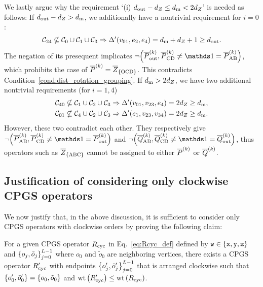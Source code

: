 \documentclass[
 prx,
 reprint,
 superscriptaddress,
 longbibliography,
 dvipsnames
]{revtex4-2}
\begin{document}
\begin{widetext}
We lastly argue why the requirement `(i) $d_{\mathrm{out}} - {d_Z} \leq d_{\mathrm{m}} < 2{d_Z}$' is needed as follows:
If $d_{\mathrm{out}} - {d_Z} > d_{\mathrm{m}}$, we additionally have a nontrivial requirement for $i=0$:
\begin{align*}
    \mathcal{C}_{24} \nsubseteq \mathcal{C}_{0} \cup \mathcal{C}_{1} \cup \mathcal{C}_{3} \Rightarrow \Delta'\qty(v_{01}, e_2, e_4) = d_{\mathrm{m}} + {d_Z} + 1 \geq d_{\mathrm{out}}.
\end{align*}
The negation of its presequent implicates $\neg\qty(\Pstage{k}_\mr{out},\Pstage{k}_\mr{CD} \neq \identity = \Pstage{k}_\mr{AB})$, which prohibits the case of $\overline{P}^{(k)} = \overline{Z}_\qty{\text{OCD}}$.
This contradicts Condition~\ref{cond:dist_rotation_grouping}.
If $d_{\mathrm{m}} > 2{d_Z}$, we have two additional nontrivial requirements (for $i=1,4$)
\begin{align*}
    \mathcal{C}_{40} \nsubseteq \mathcal{C}_{1} \cup \mathcal{C}_{2} \cup \mathcal{C}_{3} \Rightarrow \Delta'\qty(v_{01}, v_{23}, e_4) = 2{d_Z} \geq d_{\mathrm{m}},  \\ 
    \mathcal{C}_{01} \nsubseteq \mathcal{C}_{4} \cup \mathcal{C}_{2} \cup \mathcal{C}_{3} \Rightarrow \Delta'\qty(e_1, v_{23}, v_{34}) = 2{d_Z} \geq d_{\mathrm{m}}.
\end{align*}
However, these two contradict each other.
They respectively give $\neg \qty(\Pstage{k}_\mr{AB}, \Pstage{k}_\mr{CD} \neq \identity = \Pstage{k}_\mr{out})$ and $\neg \qty(\Qstage{k}_\mr{AB}, \Qstage{k}_\mr{CD} \neq \identity = \Qstage{k}_\mr{out})$, thus operators such as $\overline{Z}_\qty{\text{ABC}}$ cannot be assigned to either $\overline{P}^{(k)}$ or $\overline{Q}^{(k)}$.
\end{widetext}

\subsection{Justification of considering only clockwise CPGS operators \label{subapp:justification_clockwise_CPGS}}

We now justify that, in the above discussion, it is sufficient to consider only CPGS operators with clockwise orders by proving the following claim:
\begin{claim}
    For a given CPGS operator $R_{\mathrm{cyc}}$ in Eq.~\eqref{eq:Rcyc_def} defined by $\texttt{w} \in \qty{\texttt{x}, \texttt{y}, \texttt{z}}$ and $\qty{o_j, \tilde{o}_j}_{j=0}^{L-1}$ where $o_0$ and $\tilde{o}_0$ are neighboring vertices, there exists a CPGS operator $R'_{\mathrm{cyc}}$ with endpoints $\qty{o'_j, \tilde{o}'_j}_{j=0}^{L-1}$ that is arranged clockwise such that $\qty{o'_0, \tilde{o}'_0} = \qty{o_0, \tilde{o}_0}$ and $\operatorname{wt}\qty(R'_{\mathrm{cyc}}) \leq \operatorname{wt}\qty(R_{\mathrm{cyc}})$.
    \label{claim:justification_clockwise_only}
\end{claim}
\end{document}

